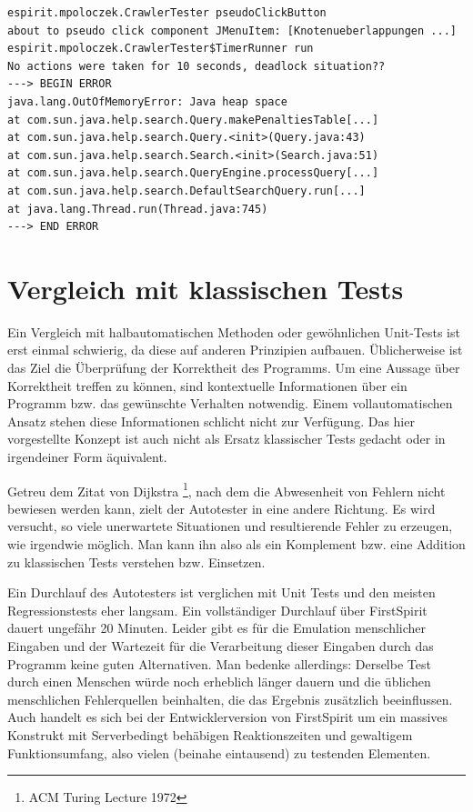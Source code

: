 \begin{lstlisting}[float=!ht,label=fmjson,caption={Ausnahme yEd durch Schaltfläche \glqq{}Knotenüberlappungen auflösen\grqq{}}]
espirit.mpoloczek.CrawlerTester pseudoClickButton
about to pseudo click component JMenuItem: [Knotenueberlappungen ...]
espirit.mpoloczek.CrawlerTester$TimerRunner run
No actions were taken for 10 seconds, deadlock situation??
---> BEGIN ERROR
java.lang.OutOfMemoryError: Java heap space
at com.sun.java.help.search.Query.makePenaltiesTable[...]
at com.sun.java.help.search.Query.<init>(Query.java:43)
at com.sun.java.help.search.Search.<init>(Search.java:51)
at com.sun.java.help.search.QueryEngine.processQuery[...]
at com.sun.java.help.search.DefaultSearchQuery.run[...]
at java.lang.Thread.run(Thread.java:745)
---> END ERROR
\end{lstlisting}



\section{Vergleich mit klassischen Tests}\label{section:testcomparisonclassic}

Ein Vergleich mit halbautomatischen Methoden oder gewöhnlichen Unit-Tests
ist erst einmal schwierig, da diese auf anderen Prinzipien aufbauen.
Üblicherweise ist das Ziel die Überprüfung der Korrektheit des Programms.
Um eine Aussage über Korrektheit treffen zu können, sind kontextuelle
Informationen über ein Programm bzw. das gewünschte Verhalten notwendig.
Einem vollautomatischen Ansatz stehen diese Informationen schlicht nicht
zur Verfügung. Das hier vorgestellte Konzept ist auch nicht als Ersatz 
klassischer Tests gedacht oder in irgendeiner Form äquivalent.

Getreu dem Zitat von Dijkstra \footnote{ACM Turing Lecture 1972},
nach dem die Abwesenheit von Fehlern nicht bewiesen werden kann,
zielt der Autotester in eine andere Richtung. Es wird versucht, so viele
unerwartete Situationen und resultierende Fehler zu erzeugen, wie
irgendwie möglich. Man kann ihn also als ein Komplement bzw. eine Addition
zu klassischen Tests verstehen bzw. Einsetzen.

Ein Durchlauf des Autotesters ist verglichen mit Unit Tests und den
meisten Regressionstests eher langsam. Ein vollständiger Durchlauf
über FirstSpirit dauert ungefähr 20 Minuten. Leider gibt es für die
Emulation menschlicher Eingaben und der Wartezeit für die Verarbeitung
dieser Eingaben durch das Programm keine guten Alternativen.
Man bedenke allerdings: Derselbe Test durch einen Menschen würde
noch erheblich länger dauern und die üblichen menschlichen Fehlerquellen
beinhalten, die das Ergebnis zusätzlich beeinflussen. Auch handelt es
sich bei der Entwicklerversion von FirstSpirit um ein massives
Konstrukt mit Serverbedingt behäbigen Reaktionszeiten und gewaltigem
Funktionsumfang, also vielen (beinahe eintausend) zu testenden Elementen.

